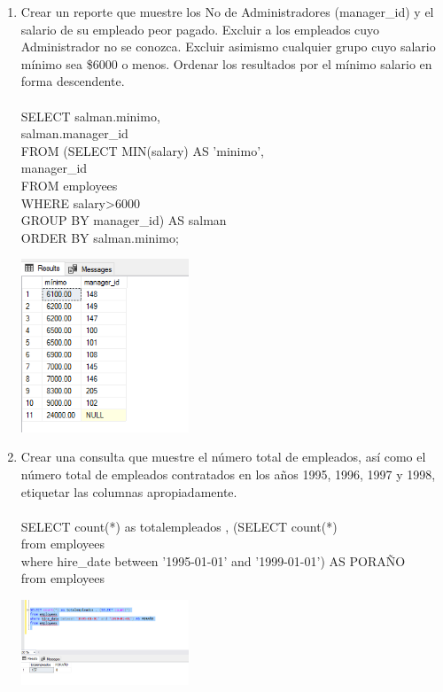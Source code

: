 \begin{enumerate}[1.]
\begin{center}
	\end{center}
	\item Crear un reporte que muestre los No de Administradores (manager\_id) y el salario de su empleado peor pagado. Excluir a los empleados cuyo Administrador no se conozca. Excluir asimismo cualquier grupo cuyo salario mínimo sea \$6000 o menos. Ordenar los resultados por el mínimo salario en forma descendente.
	\\
	\\SELECT salman.minimo,
	\\salman.manager\_id
	\\FROM (SELECT MIN(salary) AS 'minimo',
	\\manager\_id
	\\FROM employees
	\\WHERE salary>6000
	\\GROUP BY manager\_id) AS salman
	\\ORDER BY salman.minimo;
	\begin{center}
	\includegraphics[width=5cm]{./Imagenes/a7a6} 
	\end{center}
	\item Crear una consulta que muestre el número total de empleados, así como el número total de empleados contratados en los años 1995, 1996, 1997 y 1998, etiquetar las columnas apropiadamente.
	\\
	\\SELECT count(*) as totalempleados , (SELECT count(*)
	\\from employees
	\\where hire_date between '1995-01-01' and '1999-01-01') AS PORAÑO
	\\from employees
	\begin{center}
	\includegraphics[width=5cm]{./Imagenes/a7a7} 
	\end{center}


\end{enumerate}
